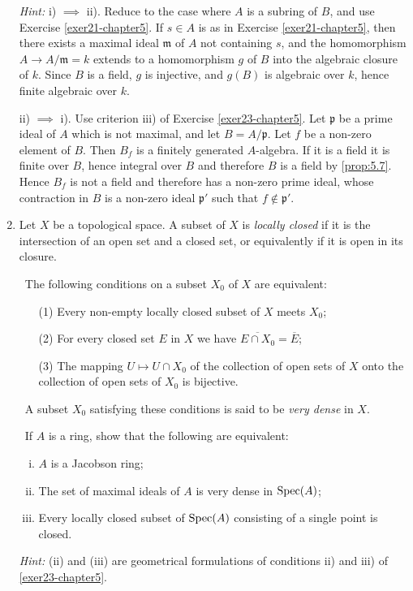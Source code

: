 \begin{enumerate}
    \textit{Hint:} i) $\implies$ ii). Reduce to the case where $A$ is a subring of $B$, and use Exercise \ref{exer21-chapter5}. If $s \in A$ is as in Exercise \ref{exer21-chapter5}, then there exists a maximal ideal $\mathfrak{m}$ of $A$ not containing $s$, and the homomorphism $A \to A/\mathfrak{m} = k$ extends to a homomorphism $g$ of $B$ into the algebraic closure of $k$. Since $B$ is a field, $g$ is injective, and $g(B)$ is algebraic over $k$, hence finite algebraic over $k$.

    ii) $\implies$ i). Use criterion iii) of Exercise \ref{exer23-chapter5}. Let $\mathfrak{p}$ be a prime ideal of $A$ which is not maximal, and let $B = A/\mathfrak{p}$. Let $f$ be a non-zero element of $B$. Then $B_f$ is a finitely generated $A$-algebra. If it is a field it is finite over $B$, hence integral over $B$ and therefore $B$ is a field by \eqref{prop:5.7}. Hence $B_f$ is not a field and therefore has a non-zero prime ideal, whose contraction in $B$ is a non-zero ideal $\mathfrak{p}'$ such that $f \notin \mathfrak{p}'$.

    \item \label{exer26-chapter5}Let $X$ be a topological space. A subset of $X$ is \emph{locally closed} if it is the intersection of an open set and a closed set, or equivalently if it is open in its closure.
    
    \quad\, The following conditions on a subset $X_0$ of $X$ are equivalent:
    \begin{enumerate}
        \item[(1)] Every non-empty locally closed subset of $X$ meets $X_0$;
        \item[(2)] For every closed set $E$ in $X$ we have $\overline{E \cap X_0} = \overline{E}$;
        \item[(3)] The mapping $U \mapsto U \cap X_0$ of the collection of open sets of $X$ onto the collection of open sets of $X_0$ is bijective.
    \end{enumerate}
    \quad\, A subset $X_0$ satisfying these conditions is said to be \emph{very dense} in $X$.

    \quad\, If $A$ is a ring, show that the following are equivalent:
    \begin{enumerate}[i)]
        \item $A$ is a Jacobson ring;
        \item The set of maximal ideals of $A$ is very dense in $\operatorname{Spec}(A)$;
        \item Every locally closed subset of $\operatorname{Spec}(A)$ consisting of a single point is closed.
    \end{enumerate}
    \textit{Hint:} (ii) and (iii) are geometrical formulations of conditions ii) and iii) of \eqref{exer23-chapter5}.


\end{enumerate}
